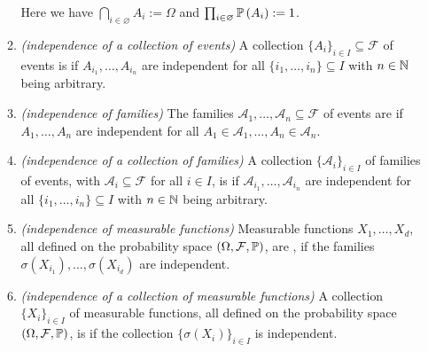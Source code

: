 \begin{enumerate}
\begin{enumerate}
\begin{note}
Here we have \(\bigcap_{i\in \varnothing}^{}A_i:=\Omega\) and
\(\prod_{i\in\varnothing}^{}\mathbb{P}\left(A_i\right):=1\).
\end{note}
\item \emph{(independence of a collection of events)} A collection
\(\{A_i\}_{i\in I}\subseteq \mathcal{F}\) of events is  if
\(A_{i_1},\dotsc,A_{i_n}\) are independent for all
\(\{i_1,\dotsc,i_n\}\subseteq I\) with \(n\in\mathbb{N}\) being arbitrary.
\item \emph{(independence of families)} The families
\(\mathcal{A}_1,\dotsc,\mathcal{A}_n\subseteq \mathcal{F}\) of events are
 if \(A_1,\dotsc,A_n\) are independent for all
\(A_1\in\mathcal{A}_1,\dotsc,A_n\in\mathcal{A}_n\).
\item \emph{(independence of a collection of families)} A collection
\(\{\mathcal{A}_i\}_{i\in I}\) of families of events, with
\(\mathcal{A}_i\subseteq \mathcal{F}\) for all \(i\in I\), is
 if \(\mathcal{A}_{i_1},\dotsc,\mathcal{A}_{i_n}\) are
independent for all \(\{i_1,\dotsc,i_n\}\subseteq I\) with \(n\in\mathbb{N}\) being
arbitrary.
\item \emph{(independence of measurable functions)} Measurable functions
\(X_1,\dotsc,X_d\), all defined on the probability space
\((\Omega,\mathcal{F},\mathbb{P})\), are , if the families
\(\sigma(X_{i_1}),\dotsc,\sigma(X_{i_d})\) are independent.
\item \emph{(independence of a collection of measurable functions)} A
collection \(\{X_i\}_{i\in I}\) of measurable functions, all defined on the
probability space \((\Omega,\mathcal{F},\mathbb{P})\), is  if the
collection \(\{\sigma(X_i)\}_{i\in I}\) is independent.


\end{enumerate}
\end{enumerate}
